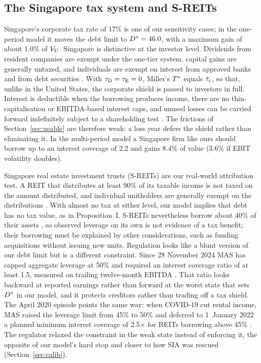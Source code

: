\subsection{The Singapore tax system and S-REITs}\label{sec:sg}

Singapore's corporate tax rate of 17\% is one of our sensitivity cases; in the one-period model it moves the debt limit to $D^{*} = 46.0$, with a maximum gain of about 1.0\% of $V_{\mathrm{U}}$. Singapore is distinctive at the investor level. Dividends from resident companies are exempt under the one-tier system, capital gains are generally untaxed, and individuals are exempt on interest from approved banks and from debt securities \citetext{Income Tax Act s13(1); \citealp{deloitte2025}}. With $\tau_{\mathrm{D}} = \tau_{\mathrm{E}} = 0$, Miller's $T^{*}$ equals $\tau_{\mathrm{c}}$, so that, unlike in the United States, the corporate shield is passed to investors in full. Interest is deductible when the borrowing produces income, there are no thin-capitalisation or EBITDA-based interest caps, and unused losses can be carried forward indefinitely subject to a shareholding test \citep{pwc2025,deloitte2025}. The frictions of Section~\ref{sec:usable} are therefore weak: a loss year defers the shield rather than eliminating it. In the multi-period model a Singapore firm like ours should borrow up to an interest coverage of 2.2 and gains 8.4\% of value (3.6\% if EBIT volatility doubles).

Singapore real estate investment trusts (S-REITs) are our real-world attribution test. A REIT that distributes at least 90\% of its taxable income is not taxed on the amount distributed, and individual unitholders are generally exempt on the distributions \citep{iras_reit}. With almost no tax at either level, our model implies that debt has no tax value, as in Proposition~I. S-REITs nevertheless borrow about 40\% of their assets \citetext{sector average gearing reported by SGX in July 2025; \citealp{sgx2025}}, so observed leverage on its own is not evidence of a tax benefit; their borrowing must be explained by other considerations, such as funding acquisitions without issuing new units. Regulation looks like a blunt version of our debt limit but is a different constraint. Since 28 November 2024 MAS has capped aggregate leverage at 50\% and required an interest coverage ratio of at least 1.5, measured on trailing twelve-month EBITDA \citep{mas2024}. That ratio looks backward at reported earnings rather than forward at the worst state that sets $D^{*}$ in our model, and it protects creditors rather than trading off a tax shield. The April 2020 episode points the same way: when COVID-19 cut rental income, MAS raised the leverage limit from 45\% to 50\% and deferred to 1~January 2022 a planned minimum interest coverage of 2.5$\times$ for REITs borrowing above 45\% \citep{mas2020}. The regulator relaxed the constraint in the weak state instead of enforcing it, the opposite of our model's hard stop and closer to how SIA was rescued (Section~\ref{sec:calib}).

